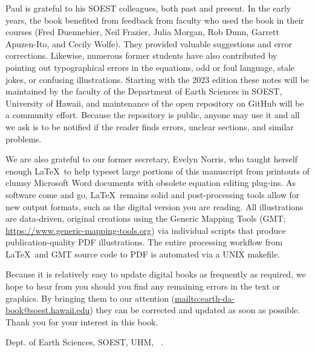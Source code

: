 Paul is grateful to his SOEST colleagues, both past and present. In the early years, the book benefited from
feedback from faculty who used the book in their courses (Fred Duennebier, Neil Frazier, Julia Morgan, Rob Dunn, Garrett Apuzen-Ito, and Cecily Wolfe).  They provided valuable suggestions and error corrections.  Likewise, numerous former students have
also contributed by pointing out typographical errors in the equations, odd or foul language,
stale jokes, or confusing illustrations.  Starting with the 2023 edition these notes will be maintained by the
faculty of the Department of Earth Sciences in SOEST, University of Hawaii, and maintenance of the open
repository on GitHub will be a community effort.  Because the repository is public, anyone may use it and
all we ask is to be notified if the reader finds errors, unclear sections, and similar problems.

We are also grateful to our former secretary, Evelyn Norris,
who taught herself enough \LaTeX\ to help typeset large portions of this manuscript from printouts of clumsy Microsoft Word documents
with obsolete equation editing plug-ins.  As software come and go, \LaTeX\ remains solid and post-processing tools allow
for new output formats, such as the digital version you are reading.  All illustrations are data-driven, original creations using the
Generic Mapping Tools (GMT; \url{https://www.generic-mapping-tools.org}) via individual scripts that produce
publication-quality PDF illustrations.  The entire processing workflow from \LaTeX\ and GMT source code to PDF is automated via a UNIX makefile.

Because it is relatively easy to update digital books as frequently as required, we hope to hear from you should you find any remaining errors
in the text or graphics.  By bringing them to our attention (\url{mailto:earth-da-book@soest.hawaii.edu})
they can be corrected and updated as soon as possible.  Thank you for your interest in this book.

\vspace{2\baselineskip}
Dept. of Earth Sciences, SOEST, UHM, \DAmonth\ \DAyear.
